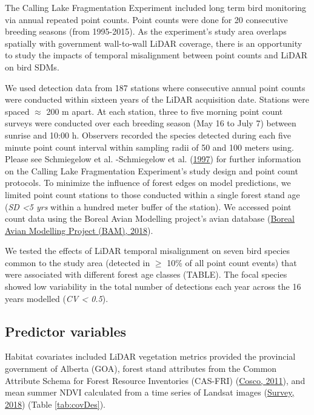 \documentclass[
]{article}
\begin{document}
The Calling Lake Fragmentation Experiment included long term bird monitoring via annual repeated point counts. Point counts were done for 20 consecutive breeding seasons (from 1995-2015). As the experiment's study area overlaps spatially with government wall-to-wall LiDAR coverage, there is an opportunity to study the impacts of temporal misalignment between point counts and LiDAR on bird SDMs.

We used detection data from 187 stations where consecutive annual point counts were conducted within sixteen years of the LiDAR acquisition date. Stations were spaced \(\approx\) 200 m apart. At each station, three to five morning point count surveys were conducted over each breeding season (May 16 to July 7) between sunrise and 10:00 h. Observers recorded the species detected during each five minute point count interval within sampling radii of 50 and 100 meters using. Please see Schmiegelow et al. -Schmiegelow et al. (\protect\hyperlink{ref-Schmiegelow1997}{1997}) for further information on the Calling Lake Fragmentation Experiment's study design and point count protocols. To minimize the influence of forest edges on model predictions, we limited point count stations to those conducted within a single forest stand age (\emph{SD \textless5 yrs} within a hundred meter buffer of the station). We accessed point count data using the Boreal Avian Modelling project's avian database (\protect\hyperlink{ref-BAM2018}{Boreal Avian Modelling Project (BAM), 2018}).

We tested the effects of LiDAR temporal misalignment on seven bird species common to the study area (detected in \(\ge\) 10\% of all point count events) that were associated with different forest age classes (TABLE). The focal species showed low variability in the total number of detections each year across the 16 years modelled (\emph{CV \textless{} 0.5}).

\hypertarget{predictor-variables}{%
\subsection{Predictor variables}\label{predictor-variables}}

Habitat covariates included LiDAR vegetation metrics provided the provincial government of Alberta (GOA), forest stand attributes from the Common Attribute Schema for Forest Resource Inventories (CAS-FRI) (\protect\hyperlink{ref-Cumming2011a}{Cosco, 2011}), and mean summer NDVI calculated from a time series of Landsat images (\protect\hyperlink{ref-geologicalsurveyLandsat47Surface2018}{Survey, 2018}) (Table \ref{tab:covDes}).
\end{document}
